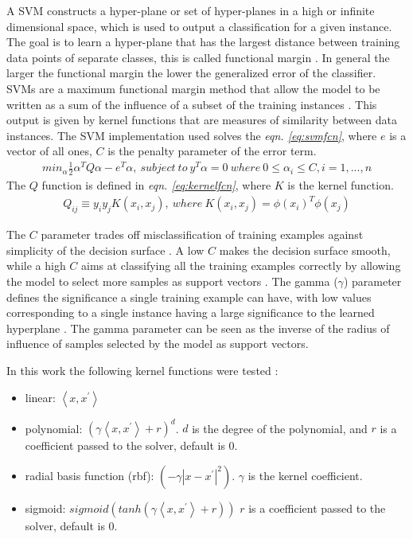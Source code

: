 \documentclass[ms]{nuthesis}
\begin{document}
\FloatBarrier
\par A SVM constructs a hyper-plane or set of hyper-planes in a high or infinite dimensional space, which
is used to output a classification for a given instance. The goal is to learn a hyper-plane that has
the largest distance between training data points of separate classes, this is called functional margin
\cite{scikit-learn}. In general the larger the functional margin the lower the generalized error of the
classifier. SVMs are a maximum functional margin method that allow the model to be written as a sum of the
influence of a subset of the training instances \cite{ethem}. This output is given by kernel functions
that are measures of similarity between data instances. The SVM implementation used solves the
\textit{eqn. \ref{eq:svmfcn}}, where $e$ is a vector of all ones, $C$ is the penalty parameter of the
error term.
\FloatBarrier
\begin{equation}
\label{eq:svmfcn}
\begin{aligned}
min_{\alpha} \frac{1}{2} \alpha^{T} Q\alpha - e^T\alpha, \
subject\  to\ y^T \alpha = 0 \ where\ 0\leq\alpha_i\leq C,i=1,...,n
\end{aligned}
\end{equation}
\FloatBarrier
The $Q$ function is defined in \textit{eqn. \ref{eq:kernelfcn}}, where $K$ is the kernel function.
\FloatBarrier
\begin{equation}
\label{eq:kernelfcn}
\begin{aligned}
Q_{ij}\equiv y_i y_j K(x_i,x_j), \ where \ K(x_i,x_j)=\phi (x_i)^T \phi(x_j)
\end{aligned}
\end{equation}
\FloatBarrier

The $C$ parameter trades off misclassification of training examples against simplicity of the
decision surface \cite{scikit-learn}. A low $C$ makes the decision surface smooth, while a high $C$ aims at
classifying all the training examples correctly by allowing the model to select more samples as support
vectors \cite{scikit-learn}. The gamma ($\gamma$) parameter defines the significance a single training example
 can have, with low values corresponding to a single instance having a large significance to the
 learned hyperplane \cite{scikit-learn}. The gamma parameter can be seen as the inverse of the radius of
 influence of samples selected by the model as support vectors.

In this work the following kernel functions were tested \cite{scikit-learn}:
\begin{itemize}
  \item linear: $\left \langle x,x^{'} \right \rangle$
  \item polynomial: $(\gamma \left \langle x,x^{'} \right \rangle + r)^{d}$. $d$ is the degree
  of the polynomial, and $r$ is a coefficient passed to the solver, default is $0$.
  \item radial basis function (rbf): $(-\gamma |x-x^{'}|^{2})$. $\gamma$ is the kernel coefficient.
  \item sigmoid: $sigmoid(tanh(\gamma \left \langle x,x^{'} \right \rangle + r))$
  $r$ is a coefficient passed to the solver, default is $0$.
\end{itemize}
\end{document}
